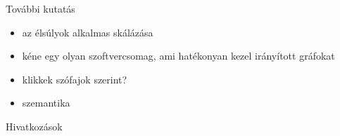 \documentclass{beamer}
\newlength{\onecolwid}
\begin{document}
\begin{frame}[t]
\begin{columns}[t]
\begin{column}{\onecolwid}
        \begin{block}{További kutatás}
          \begin{itemize}
            \item az élsúlyok alkalmas skálázása
            \item kéne egy olyan szoftvercsomag, ami hatékonyan kezel
              irányított gráfokat
            \item klikkek szófajok szerint?
            \item szemantika
          \end{itemize}
        \end{block}

        \begin{block}{Hivatkozások}
          \small
          
          
        \end{block}

      \end{column}
  \end{columns}
\end{frame}
\end{document}
